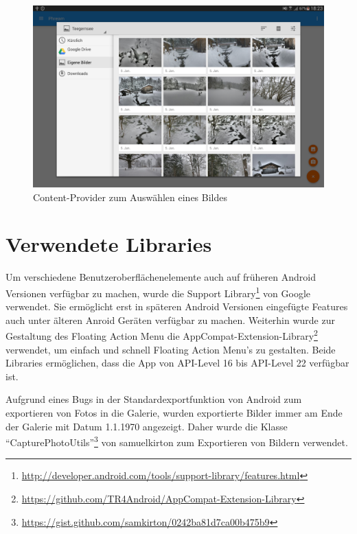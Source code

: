 \begin{figure}[H]
\centering
\includegraphics[scale=0.17]{images/screenshots/content_provider.png}
\caption{Content-Provider zum Auswählen eines Bildes}
\label{label:content_provider}
\end{figure}

\section{Verwendete Libraries}
Um verschiedene Benutzeroberflächenelemente auch auf früheren Android Versionen verfügbar zu machen, wurde die Support Library\footnote{\url{http://developer.android.com/tools/support-library/features.html}} von Google verwendet. Sie ermöglicht erst in späteren Android Versionen eingefügte Features auch unter älteren Anroid Geräten verfügbar zu machen. Weiterhin wurde zur Gestaltung des Floating Action Menu die AppCompat-Extension-Library\footnote{\url{https://github.com/TR4Android/AppCompat-Extension-Library}} verwendet, um einfach und schnell Floating Action Menu's zu gestalten. Beide Libraries ermöglichen, dass die App von API-Level 16 bis API-Level 22 verfügbar ist.

Aufgrund eines Bugs in der Standardexportfunktion von Android zum exportieren von Fotos in die Galerie, wurden exportierte Bilder immer am Ende der Galerie mit Datum 1.1.1970 angezeigt. Daher wurde die Klasse \enquote{CapturePhotoUtils}\footnote{\url{https://gist.github.com/samkirton/0242ba81d7ca00b475b9}} von samuelkirton zum Exportieren von Bildern verwendet.
